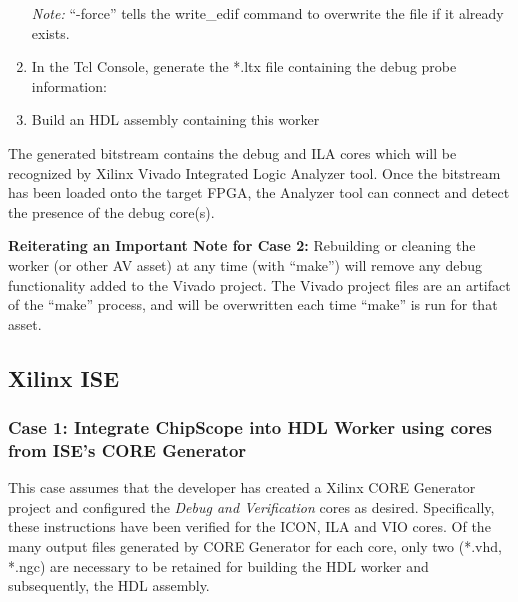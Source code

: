 \begin{flushleft}
\begin{enumerate}
			\subitem {}
			\subitem \textit{Note:} ``-force'' tells the write\_edif command to overwrite the file if it already exists.
		\item In the Tcl Console, generate the *.ltx file containing the debug probe information:
			\subitem {}
		\item Build an HDL assembly containing this worker
	\end{enumerate}
The generated bitstream contains the debug and ILA cores which will be recognized by Xilinx Vivado Integrated Logic Analyzer tool. Once the bitstream has been loaded onto the target FPGA, the Analyzer tool can connect and detect the presence of the debug core(s).\newline

\textbf{Reiterating an Important Note for Case 2:} Rebuilding or cleaning the worker (or other AV asset) at any time (with ``make'') will remove any debug functionality added to the Vivado project. The Vivado project files are an artifact of the ``make'' process, and will be overwritten each time ``make'' is run for that asset.


\subsection{Xilinx ISE}
	\subsubsection{Case 1: Integrate ChipScope into HDL Worker using cores from ISE's CORE Generator}
\label{ise1}
		This case assumes that the developer has created a Xilinx CORE Generator project and configured the \textit{Debug and Verification} cores as desired. Specifically, these instructions have been verified for the ICON, ILA and VIO cores. Of the many output files generated by CORE Generator for each core, only two (*.vhd, *.ngc) are necessary to be retained for building the HDL worker and subsequently, the HDL assembly.


\end{flushleft}
